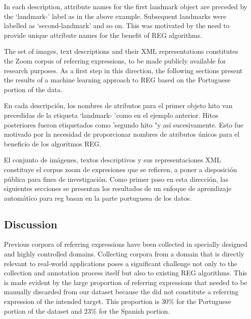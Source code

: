 In each description, attribute names for the first landmark object are preceded by the `landmark-' label as in the above example. Subsequent landmarks were labelled as `second-landmark' and so on. This was motivated by the need to provide unique attribute names for the benefit of REG algorithms.

The set of images, text descriptions and their XML representations constitutes the Zoom corpus of referring expressions, to be made publicly available for research purposes. As a first step in this direction, the following sections present the results of a machine learning approach to REG based on the Portuguese portion of the data.

En cada descripci\'on, los nombres de atributos para el primer objeto hito van precedidas de la etiqueta `landmark- 'como en el ejemplo anterior. Hitos posteriores fueron etiquetados como 'segundo hito "y as\'{i} sucesivamente. Esto fue motivado por la necesidad de proporcionar nombres de atributos \'unicos para el beneficio de los algoritmos REG.

El conjunto de im\'agenes, textos descriptivos y sus representaciones XML constituye el corpus zoom de expresiones que se refieren, a poner a disposici\'on p\'ublica para fines de investigaci\'on. Como primer paso en esta direcci\'on, las siguientes secciones se presentan los resultados de un enfoque de aprendizaje autom\'atico para reg basan en la parte portuguesa de los datos.


\subsection{Discussion}
\label{sec-problems}

Previous corpora of referring expressions have been collected in specially designed and highly controlled domains. Collecting corpora from a domain that is directly relevant to real-world applications poses a significant challenge not only to the collection and annotation process itself but also to existing REG algorithms. This is made evident by the large proportion of referring expressions that needed to be manually discarded from our dataset because the did not constitute a referring expression of the intended target. This proportion is 30\% for the Portuguese portion of the dataset and 23\% for the Spanish portion. 

